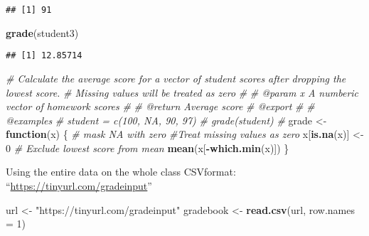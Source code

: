 \documentclass[
]{article}
\newenvironment{Shaded}{\begin{snugshade}}{\end{snugshade}}
\newcommand{\AttributeTok}[1]{\textcolor[rgb]{0.13,0.29,0.53}{#1}}
\newcommand{\CommentTok}[1]{\textcolor[rgb]{0.56,0.35,0.01}{\textit{#1}}}
\newcommand{\ControlFlowTok}[1]{\textcolor[rgb]{0.13,0.29,0.53}{\textbf{#1}}}
\newcommand{\DecValTok}[1]{\textcolor[rgb]{0.00,0.00,0.81}{#1}}
\newcommand{\FunctionTok}[1]{\textcolor[rgb]{0.13,0.29,0.53}{\textbf{#1}}}
\newcommand{\NormalTok}[1]{#1}
\newcommand{\OtherTok}[1]{\textcolor[rgb]{0.56,0.35,0.01}{#1}}
\newcommand{\SpecialCharTok}[1]{\textcolor[rgb]{0.81,0.36,0.00}{\textbf{#1}}}
\newcommand{\StringTok}[1]{\textcolor[rgb]{0.31,0.60,0.02}{#1}}
\begin{document}
\begin{verbatim}
## [1] 91
\end{verbatim}

\begin{Shaded}
\begin{Highlighting}[]
\FunctionTok{grade}\NormalTok{(student3)}
\end{Highlighting}
\end{Shaded}

\begin{verbatim}
## [1] 12.85714
\end{verbatim}

\begin{Shaded}
\begin{Highlighting}[]
\CommentTok{\#\textquotesingle{} Calculate the average score for a vector of student scores after dropping the lowest score.}
\CommentTok{\#\textquotesingle{} Missing values will be treated as zero}
\CommentTok{\#\textquotesingle{} }
\CommentTok{\#\textquotesingle{} @param x A numberic vector of homework scores}
\CommentTok{\#\textquotesingle{}}
\CommentTok{\#\textquotesingle{} @return Average score}
\CommentTok{\#\textquotesingle{} @export}
\CommentTok{\#\textquotesingle{}}
\CommentTok{\#\textquotesingle{} @examples}
\CommentTok{\#\textquotesingle{} student = c(100, NA, 90, 97)}
\CommentTok{\#\textquotesingle{} grade(student)}
\CommentTok{\#\textquotesingle{} }
\NormalTok{grade }\OtherTok{\textless{}{-}} \ControlFlowTok{function}\NormalTok{(x) \{}
  \CommentTok{\# mask NA with zero}
  \CommentTok{\#Treat missing values as zero}
\NormalTok{  x[}\FunctionTok{is.na}\NormalTok{(x)] }\OtherTok{\textless{}{-}} \DecValTok{0}
  \CommentTok{\# Exclude lowest score from mean}
  \FunctionTok{mean}\NormalTok{(x[}\SpecialCharTok{{-}}\FunctionTok{which.min}\NormalTok{(x)])}
\NormalTok{\}}
\end{Highlighting}
\end{Shaded}

Using the entire data on the whole class CSVformat:
``\url{https://tinyurl.com/gradeinput}''

\begin{Shaded}
\begin{Highlighting}[]
\NormalTok{url }\OtherTok{\textless{}{-}} \StringTok{"https://tinyurl.com/gradeinput"}
\NormalTok{gradebook }\OtherTok{\textless{}{-}} \FunctionTok{read.csv}\NormalTok{(url, }\AttributeTok{row.names =} \DecValTok{1}\NormalTok{)}
\end{Highlighting}
\end{Shaded}
\end{document}

